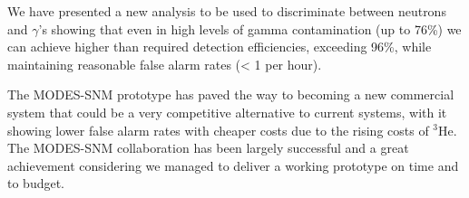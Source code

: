 We have presented a new analysis to be used to discriminate between neutrons and $\gamma$'s showing that even in high levels of gamma contamination (up to 76\%) we can achieve higher than required detection efficiencies, exceeding 96\%, while maintaining reasonable false alarm rates (< 1 per hour).

The MODES-SNM prototype has paved the way to becoming a new commercial system that could be a very competitive alternative to current systems, with it showing lower false alarm rates with cheaper costs due to the rising costs of $^{3}$He. The MODES-SNM collaboration has been largely successful and a great achievement considering we managed to deliver a working prototype on time and to budget.